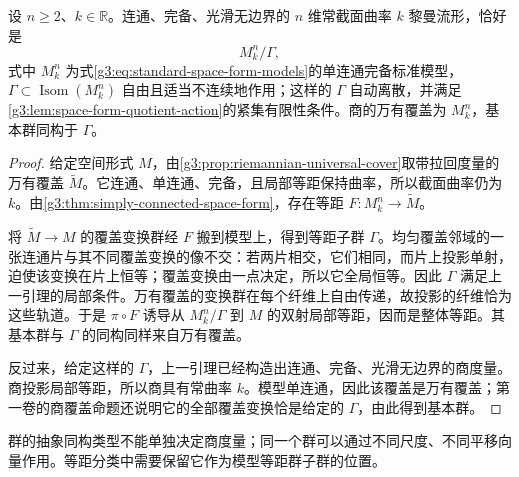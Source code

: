 \begin{theorem}\label{g3:thm:space-form-quotient}
	设 \(n\ge2\)、\(k\in\mathbb R\)。连通、完备、光滑无边界的 \(n\) 维常截面曲率 \(k\) 黎曼流形，恰好是
	\[
		M_k^n/\Gamma,
	\]
	式中 \(M_k^n\) 为式\eqref{g3:eq:standard-space-form-models}的单连通完备标准模型，\(\Gamma\subset\operatorname{Isom}(M_k^n)\) 自由且适当不连续地作用；这样的 \(\Gamma\) 自动离散，并满足\cref{g3:lem:space-form-quotient-action}的紧集有限性条件。商的万有覆盖为 \(M_k^n\)，基本群同构于 \(\Gamma\)。
\end{theorem}
\begin{proof}
	给定空间形式 \(M\)，由\cref{g3:prop:riemannian-universal-cover}取带拉回度量的万有覆盖 \(\widetilde M\)。它连通、单连通、完备，且局部等距保持曲率，所以截面曲率仍为 \(k\)。由\cref{g3:thm:simply-connected-space-form}，存在等距 \(F:M_k^n\to\widetilde M\)。

	将 \(\widetilde M\to M\) 的覆盖变换群经 \(F\) 搬到模型上，得到等距子群 \(\Gamma\)。均匀覆盖邻域的一张连通片与其不同覆盖变换的像不交：若两片相交，它们相同，而片上投影单射，迫使该变换在片上恒等；覆盖变换由一点决定，所以它全局恒等。因此 \(\Gamma\) 满足上一引理的局部条件。万有覆盖的变换群在每个纤维上自由传递，故投影的纤维恰为这些轨道。于是 \(\pi\circ F\) 诱导从 \(M_k^n/\Gamma\) 到 \(M\) 的双射局部等距，因而是整体等距。其基本群与 \(\Gamma\) 的同构同样来自万有覆盖。

	反过来，给定这样的 \(\Gamma\)，上一引理已经构造出连通、完备、光滑无边界的商度量。商投影局部等距，所以商具有常曲率 \(k\)。模型单连通，因此该覆盖是万有覆盖；第一卷的商覆盖命题还说明它的全部覆盖变换恰是给定的 \(\Gamma\)，由此得到基本群。
\end{proof}

群的抽象同构类型不能单独决定商度量；同一个群可以通过不同尺度、不同平移向量作用。等距分类中需要保留它作为模型等距群子群的位置。

